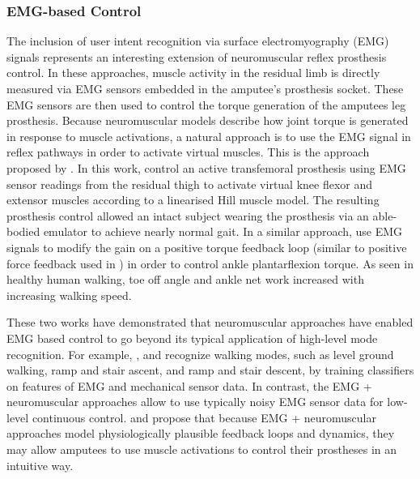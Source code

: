 \subsubsection{EMG-based Control}\label{sec:back_emg_control}
The inclusion of user intent recognition via surface electromyography (EMG)
signals represents an interesting extension of neuromuscular reflex prosthesis
control. In these approaches, muscle activity in the residual limb is directly
measured via EMG sensors embedded in the amputee's prosthesis socket. These EMG
sensors are then used to control the torque generation of the amputees leg
prosthesis. Because neuromuscular models describe how joint torque is generated
in response to muscle activations, a natural approach is to use the EMG signal
in reflex pathways in order to activate virtual muscles. This is the approach
proposed by \citet{wu2011electromyography}. In this work,
\citeauthor{wu2011electromyography} control an active transfemoral prosthesis
using EMG sensor readings from the residual thigh to activate virtual knee
flexor and extensor muscles according to a linearised Hill muscle model. The
resulting prosthesis control allowed an intact subject wearing the prosthesis
via an able-bodied emulator to achieve nearly normal gait. In a similar
approach, \citet{wang2013proportional} use EMG signals to modify the gain on a
positive torque feedback loop (similar to positive force feedback used in
\citet{geyer2010muscle}) in order to control ankle plantarflexion torque. As
seen in healthy human walking, toe off angle and ankle net work increased with
increasing walking speed.

These two works have demonstrated that neuromuscular approaches have enabled EMG
based control to go beyond its typical application of high-level mode
recognition. For example, \citet{huang2009strategy, huang2011continuous}, and
\citet{hargrove2015intuitive} recognize walking modes, such as level ground
walking, ramp and stair ascent, and ramp and stair descent, by training
classifiers on features of EMG and mechanical sensor data. In contrast, the EMG
+ neuromuscular approaches allow to use typically noisy EMG sensor data for
low-level continuous control. \citet{wu2011electromyography} and
\citet{wang2013proportional} propose that because EMG + neuromuscular approaches
model physiologically plausible feedback loops and dynamics, they may allow
amputees to use muscle activations to control their prostheses in an intuitive
way.

